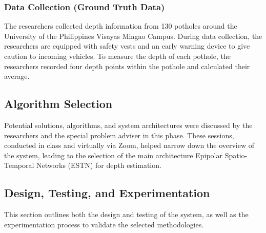\subsubsection{Data Collection (Ground Truth Data)}
The researchers collected depth information from 130 potholes around the University of the Philippines Visayas Miagao Campus. During data collection, the researchers are equipped with safety vests and an early warning device to give caution to incoming vehicles. To measure the depth of each pothole, the researchers recorded four depth points within the pothole and calculated their average.

\subsection{\textbf{Algorithm Selection } }
Potential solutions, algorithms, and system architectures were discussed by the researchers and the special problem adviser in this phase. These sessions, conducted in class and virtually via Zoom, helped narrow down the overview of the system, leading to the selection of the main architecture Epipolar Spatio-Temporal Networks (ESTN) for depth estimation. 



\subsection{\textbf{Design, Testing, and Experimentation} }
This section outlines both the design and testing of the system, as well as the experimentation process to validate the selected methodologies. 


